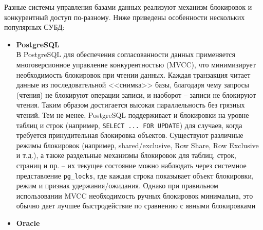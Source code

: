  Разные системы управления базами данных реализуют механизм блокировок и конкурентный доступ по-разному. Ниже приведены особенности нескольких популярных СУБД: 
 \begin{itemize}
    \item \textbf{PostgreSQL} \autocite{PostgreSQLdocc52} ~\\
    В PostgreSQL для обеспечения согласованности данных применяется многоверсионное управление конкурентностью (MVCC), что минимизирует необходимость блокировок при чтении данных. Каждая транзакция читает данные из последовательной <<снимка>> базы, благодаря чему запросы (чтения) не блокируют операции записи, и наоборот – записи не блокируют чтения. Таким образом достигается высокая параллельность без грязных чтений. Тем не менее, PostgreSQL поддерживает и блокировки на уровне таблиц и строк (например, \texttt{SELECT ... FOR UPDATE}) для случаев, когда требуется принудительная блокировка объектов. Существуют различные режимы блокировок (например, shared/exclusive, Row Share, Row Exclusive и т.д.), а также раздельные механизмы блокировок для таблиц, строк, страниц и пр. – их текущее состояние можно наблюдать через системное представление \texttt{pg\_locks}, где каждая строка показывает объект блокировки, режим и признак удержания/ожидания. Однако при правильном использовании MVCC необходимость ручных блокировок минимальна, это обычно дает лучшее быстродействие по сравнению с явными блокировками
    \item \textbf{Oracle} \autocites{oracledbdoc5, oracleessentialsc7} ~\\

\end{itemize}
